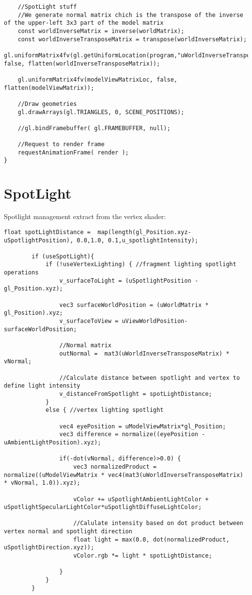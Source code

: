 \documentclass[10pt,a4paper]{article}
\begin{document}
\begin{verbatim}
    //SpotLight stuff
    //We generate normal matrix chich is the transpose of the inverse of the upper-left 3x3 part of the model matrix
    const worldInverseMatrix = inverse(worldMatrix);
    const worldInverseTransposeMatrix = transpose(worldInverseMatrix);
    gl.uniformMatrix4fv(gl.getUniformLocation(program,"uWorldInverseTransposeMatrix"), false, flatten(worldInverseTransposeMatrix)); 

    gl.uniformMatrix4fv(modelViewMatrixLoc, false, flatten(modelViewMatrix));

    //Draw geometries
    gl.drawArrays(gl.TRIANGLES, 0, SCENE_POSITIONS);

    //gl.bindFramebuffer( gl.FRAMEBUFFER, null);
   
    //Request to render frame
    requestAnimationFrame( render );
}

\end{verbatim}

\section{SpotLight}
Spotlight management extract from the vertex shader:
\begin{verbatim}
float spotLightDistance =  map(length(gl_Position.xyz-uSpotlightPosition), 0.0,1.0, 0.1,u_spotlightIntensity);
        
        if (useSpotLight){
            if (!useVertexLighting) { //fragment lighting spotlight operations
                v_surfaceToLight = (uSpotlightPosition - gl_Position.xyz);

                vec3 surfaceWorldPosition = (uWorldMatrix * gl_Position).xyz;
                v_surfaceToView = uViewWorldPosition-surfaceWorldPosition;
                
                //Normal matrix
                outNormal =  mat3(uWorldInverseTransposeMatrix) * vNormal;

                //Calculate distance between spotlight and vertex to define light intensity
                v_distanceFromSpotlight = spotLightDistance;
            }
            else { //vertex lighting spotlight
       
                vec4 eyePosition = uModelViewMatrix*gl_Position;
                vec3 difference = normalize((eyePosition - uAmbientLightPosition).xyz);

                if(-dot(vNormal, difference)>0.0) {
                    vec3 normalizedProduct = normalize((uModelViewMatrix * vec4(mat3(uWorldInverseTransposeMatrix) * vNormal, 1.0)).xyz);

                    vColor += uSpotlightAmbientLightColor + uSpotlightSpecularLightColor*uSpotlightDiffuseLightColor;
              
                    //Calulate intensity based on dot product between vertex normal and spotlight direction
                    float light = max(0.0, dot(normalizedProduct, uSpotlightDirection.xyz));     
                    vColor.rgb *= light * spotLightDistance;
                    
                }     
            }
        }
\end{verbatim}
\end{document}

